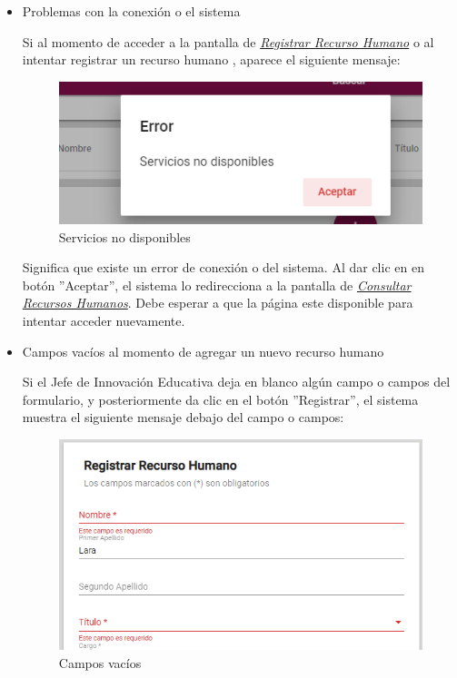                 \begin{itemize}
                    \item Problemas con la conexión o el sistema

                        Si al momento de acceder a la pantalla de \hyperlink{registrarRH}{\textit{Registrar Recurso Humano}} o al intentar registrar un recurso humano , aparece el siguiente mensaje:

                        \begin{figure}[H]
                        \centering
                        \includegraphics[width=0.4\linewidth]{images/SP1/MSGSN}
                        \caption{Servicios no disponibles}
                        \label{SND}

                      \end{figure}

                        Significa que existe un error de conexión o del sistema. Al dar clic en en botón ''Aceptar'', el sistema lo redirecciona a la pantalla de \hyperlink{consultarRH}{\textit{Consultar Recursos Humanos}}. Debe esperar a que la página este disponible para  intentar acceder nuevamente.

                    \item Campos vacíos al momento de agregar un nuevo recurso humano

                        Si el Jefe de Innovación Educativa deja en blanco algún campo o campos del formulario, y posteriormente da clic en el botón ''Registrar'', el sistema muestra el siguiente mensaje debajo del campo o campos:

                         \begin{figure}[H]
                            \centering
                        \includegraphics[width=0.4\linewidth]{images/SP1/MSG44}
                            \caption{Campos vacíos}
                        \label{mensaje44}
                       \end{figure}


\end{itemize}
